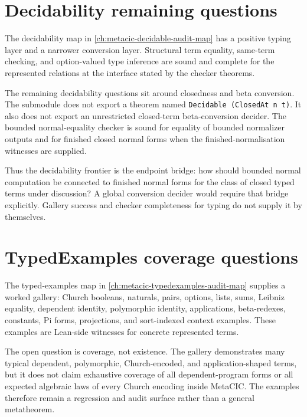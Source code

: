 \section{Decidability remaining questions}
\label{sec:metacic-open-problems-decidability}

The decidability map in \autoref{ch:metacic-decidable-audit-map} has a positive
typing layer and a narrower conversion layer. Structural term equality,
same-term checking, and option-valued type inference are sound and complete for
the represented relations at the interface stated by the checker theorems.

The remaining decidability questions sit around closedness and beta
conversion. The submodule does not export a theorem named
\texttt{Decidable (ClosedAt n t)}. It also does not export an unrestricted
closed-term beta-conversion decider. The bounded normal-equality checker is
sound for equality of bounded normalizer outputs and for finished closed normal
forms when the finished-normalisation witnesses are supplied.

Thus the decidability frontier is the endpoint bridge: how should bounded
normal computation be connected to finished normal forms for the class of
closed typed terms under discussion? A global conversion decider would require
that bridge explicitly. Gallery success and checker completeness for typing do
not supply it by themselves.

\section{TypedExamples coverage questions}
\label{sec:metacic-open-problems-typedexamples}

The typed-examples map in \autoref{ch:metacic-typedexamples-audit-map} supplies
a worked gallery: Church booleans, naturals, pairs, options, lists, sums,
Leibniz equality, dependent identity, polymorphic identity, applications,
beta-redexes, constants, Pi forms, projections, and sort-indexed context
examples. These examples are Lean-side witnesses for concrete represented
terms.

The open question is coverage, not existence. The gallery demonstrates many
typical dependent, polymorphic, Church-encoded, and application-shaped terms,
but it does not claim exhaustive coverage of all dependent-program forms or all
expected algebraic laws of every Church encoding inside MetaCIC. The examples
therefore remain a regression and audit surface rather than a general
metatheorem.

